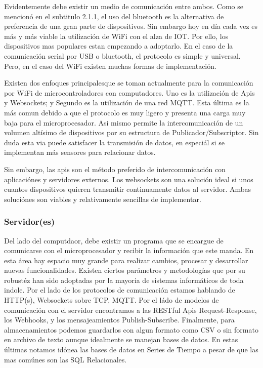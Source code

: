 Evidentemente debe existir un medio de comunicación entre ambos. Como se mencionó en el subtitulo 2.1.1, el uso del bluetooth es la alternativa de preferencia de una gran parte de dispositivos. Sin embargo hoy en día cada vez es más y más viable la utilización de WiFi con el alza de IOT. Por ello, los dispositivos mas populares estan empezando a adoptarlo. En el caso de la comunicación serial por USB o bluetooth, el protocolo es simple y universal. Pero, en el caso del WiFi existen muchas formas de implementación.

Existen dos enfoques principalesque se toman actualmente para la comunicación por WiFi de microcontroladores con computadores. Uno es la utilización de Apis y Websockets; y Segundo es la utilización de una red MQTT. Esta última es la más comun debido a que el protocolo es muy ligero y presenta una carga muy baja para el microprocesador. Asi mismo permite la intercomunicación de un volumen altísimo de dispositivos por su estructura de Publicador/Subscriptor. Sin duda esta via puede satisfacer la transmisión de datos, en especiál si se implementan más sensores para relacionar datos.

Sin embargo, las apis son el método preferido de intercomunicación con aplicaciónes y servidores externos. Los websockets son una solución ideal si unos cuantos dispositivos quieren transmitir continuamente datos al servidor. Ambas soluciónes son viables y relativamente sencillas de implementar.

\subsubsection{Servidor(es)}
\label{sec:orge6461c2}
Del lado del computdaor, debe existir un programa que se encargue de comunicarse con el microprocesador y recibir la información que este manda. En esta área hay espacio muy grande para realizar cambios, procesar y desarrollar nuevas funcionalidades. Existen ciertos parámetros y metodologías que por su robustéz han sido adoptadas por la mayoria de sistemas informáticos de toda indole. Por el lado de los protocolos de comunicación estamos hablando de HTTP(s), Websockets sobre TCP, MQTT. Por el ládo de modelos de comunicación con el servidor encontramos a las RESTful Apis Request-Response, los Webhooks, y los mensajeamientos Publish-Subscribe. Finalmente, para almacenamientos podemos guardarlos con algun formato como CSV o sin formato en archivo de texto aunque idealmente se manejan bases de datos. En estas últimas notamos idónea las bases de datos en Series de Tiempo a pesar de que las mas comúnes son las SQL Relacionales.

